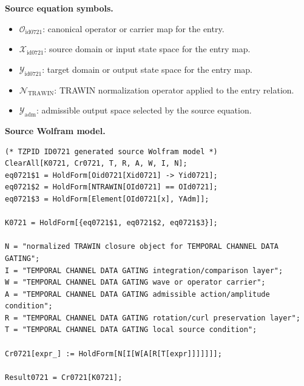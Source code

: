 \begin{minipage}[t]{0.49\linewidth}
\begingroup
\small
\raggedright
\textbf{Source equation symbols.}\par
\begin{itemize}[leftmargin=1.35em,itemsep=1pt,topsep=1pt,parsep=0pt]
    \item $\mathcal{O}_{\mathrm{id0721}}$: canonical operator or carrier map for the entry.
    \item $\mathcal{X}_{\mathrm{id0721}}$: source domain or input state space for the entry map.
    \item $\mathcal{Y}_{\mathrm{id0721}}$: target domain or output state space for the entry map.
    \item $\mathcal{N}_{\mathrm{TRAWIN}}$: TRAWIN normalization operator applied to the entry relation.
    \item $\mathcal{Y}_{\mathrm{adm}}$: admissible output space selected by the source equation.
\end{itemize}
\endgroup
\end{minipage}\hfill
\begin{minipage}[t]{0.47\linewidth}
\begingroup
\scriptsize
\raggedright
\textbf{Source Wolfram model.}\par
\begin{Verbatim}[fontsize=\tiny,breaklines=true,breakanywhere=true]
(* TZPID ID0721 generated source Wolfram model *)
ClearAll[K0721, Cr0721, T, R, A, W, I, N];
eq0721$1 = HoldForm[Oid0721[Xid0721] -> Yid0721];
eq0721$2 = HoldForm[NTRAWIN[OId0721] == OId0721];
eq0721$3 = HoldForm[Element[OId0721[x], YAdm]];

K0721 = HoldForm[{eq0721$1, eq0721$2, eq0721$3}];

N = "normalized TRAWIN closure object for TEMPORAL CHANNEL DATA GATING";
I = "TEMPORAL CHANNEL DATA GATING integration/comparison layer";
W = "TEMPORAL CHANNEL DATA GATING wave or operator carrier";
A = "TEMPORAL CHANNEL DATA GATING admissible action/amplitude condition";
R = "TEMPORAL CHANNEL DATA GATING rotation/curl preservation layer";
T = "TEMPORAL CHANNEL DATA GATING local source condition";

Cr0721[expr_] := HoldForm[N[I[W[A[R[T[expr]]]]]]];

Result0721 = Cr0721[K0721];
\end{Verbatim}
\endgroup
\end{minipage}

